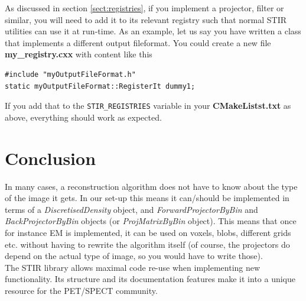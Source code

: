 \documentclass{article}
\begin{document}
As discussed in section \ref{sect:registries}, if you implement a projector, filter
or similar, you will need to add it to its relevant registry
such that normal STIR utilities can use it at run-time.
As an example, let us say you have written a class that implements
a different output fileformat. You could create a new file \textbf{my\_registry.cxx} with
content like this
\begin{verbatim}
#include "myOutputFileFormat.h"
static myOutputFileFormat::RegisterIt dummy1;
\end{verbatim}
If you add that to the \texttt{STIR\_REGISTRIES} variable in your \textbf{CMakeListst.txt}
as above, everything should work as expected.


\section{
Conclusion}

In many cases, a reconstruction algorithm does not have to know 
about the type of the image it gets. In our set-up this means 
it can/should be implemented in terms of a \textit{DiscretisedDensity} 
object, and \textit{ForwardProjectorByBin} and \textit{BackProjectorByBin} 
objects (or \textit{ProjMatrixByBin} object). This means that once 
for instance EM is implemented, it can be used on voxels, blobs, 
different grids etc. without having to rewrite the algorithm 
itself (of course, the projectors do depend on the actual type 
of image, so you would have to write those).\\
The STIR library allows maximal code re-use when implementing 
new functionality. Its structure and its documentation features 
make it into a unique resource for the PET/SPECT community. 
\end{document}
